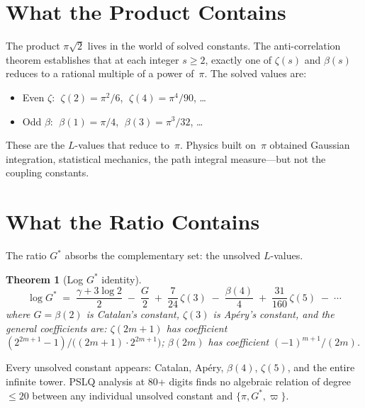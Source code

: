 \documentclass[12pt,reqno]{amsart}
\newtheorem{theorem}{Theorem}[section]
\theoremstyle{definition}
\theoremstyle{remark}
\newcommand{\Gstar}{G^{\!*}}
\begin{document}
\section{What the Product Contains}

The product $\pi\sqrt{2}$ lives in the world of solved constants.
The anti-correlation theorem \cite{cpaci-tani2026a} establishes that at each integer
$s\geq 2$, exactly one of $\zeta(s)$ and $\beta(s)$ reduces to a rational multiple
of a power of~$\pi$. The solved values are:
\begin{itemize}[nosep]
  \item Even $\zeta$: $\;\zeta(2)=\pi^2/6$, $\;\zeta(4)=\pi^4/90$, \ldots
  \item Odd $\beta$: $\;\beta(1)=\pi/4$, $\;\beta(3)=\pi^3/32$, \ldots
\end{itemize}
These are the $L$-values that reduce to~$\pi$. Physics built on~$\pi$ obtained Gaussian
integration, statistical mechanics, the path integral measure---but not the coupling
constants.

\section{What the Ratio Contains}

The ratio $\Gstar$ absorbs the complementary set: the unsolved $L$-values.

\begin{theorem}[Log $\Gstar$ identity]\label{thm:loggstar}
\begin{equation}\label{eq:loggstar}
  \log\Gstar \;=\; \frac{\gamma+3\log 2}{2}
  \;-\;\frac{G}{2}
  \;+\;\frac{7}{24}\,\zeta(3)
  \;-\;\frac{\beta(4)}{4}
  \;+\;\frac{31}{160}\,\zeta(5)
  \;-\;\cdots
\end{equation}
where $G=\beta(2)$ is Catalan's constant, $\zeta(3)$ is Ap\'ery's constant, and the
general coefficients are: $\zeta(2m+1)$ has coefficient
$(2^{2m+1}-1)/\bigl((2m+1)\cdot 2^{2m+1}\bigr)$; $\beta(2m)$ has coefficient
$(-1)^{m+1}/(2m)$.
\end{theorem}

Every unsolved constant appears: Catalan, Ap\'ery, $\beta(4)$, $\zeta(5)$, and the
entire infinite tower. PSLQ analysis at 80+ digits finds no algebraic relation of
degree~$\leq 20$ between any individual unsolved constant and
$\{\pi,\Gstar,\varpi\}$.
\end{document}
